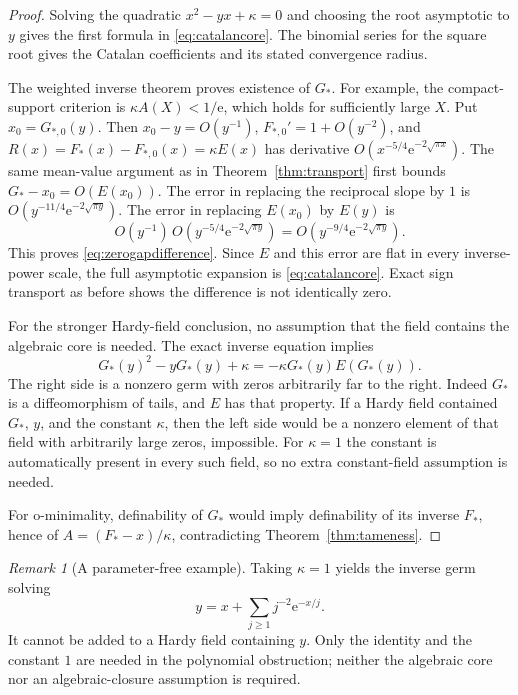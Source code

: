 \documentclass[11pt,a4paper]{article}
\theoremstyle{definition}
\theoremstyle{remark}
\newtheorem{remark}[theorem]{Remark}
\newcommand{\e}{\mathrm e}
\numberwithin{equation}{section}
\begin{document}
\begin{proof}
Solving the quadratic $x^2-yx+\kappa=0$ and choosing the root asymptotic to $y$ gives the first formula in \eqref{eq:catalancore}. The binomial series for the square root gives the Catalan coefficients and its stated convergence radius.

The weighted inverse theorem proves existence of $G_*$. For example, the compact-support criterion is $\kappa A(X)<1/\e$, which holds for sufficiently large $X$. Put $x_0=G_{*,0}(y)$. Then $x_0-y=O(y^{-1})$, $F_{*,0}'=1+O(y^{-2})$, and $R(x)=F_*(x)-F_{*,0}(x)=\kappa E(x)$ has derivative $O(x^{-5/4}\e^{-2\sqrt{\pi x}})$. The same mean-value argument as in Theorem~\ref{thm:transport} first bounds $G_*-x_0=O(E(x_0))$. The error in replacing the reciprocal slope by $1$ is $O(y^{-11/4}\e^{-2\sqrt{\pi y}})$. The error in replacing $E(x_0)$ by $E(y)$ is
\[
 O(y^{-1})\,O(y^{-5/4}\e^{-2\sqrt{\pi y}})
 =O(y^{-9/4}\e^{-2\sqrt{\pi y}}).
\]
This proves \eqref{eq:zerogapdifference}. Since $E$ and this error are flat in every inverse-power scale, the full asymptotic expansion is \eqref{eq:catalancore}. Exact sign transport as before shows the difference is not identically zero.

For the stronger Hardy-field conclusion, no assumption that the field contains the algebraic core is needed. The exact inverse equation implies
\begin{equation}\label{eq:polynomialobstruction}
 G_*(y)^2-yG_*(y)+\kappa
 =-\kappa G_*(y)E(G_*(y)).
\end{equation}
The right side is a nonzero germ with zeros arbitrarily far to the right. Indeed $G_*$ is a diffeomorphism of tails, and $E$ has that property. If a Hardy field contained $G_*$, $y$, and the constant $\kappa$, then the left side would be a nonzero element of that field with arbitrarily large zeros, impossible. For $\kappa=1$ the constant is automatically present in every such field, so no extra constant-field assumption is needed.

For o-minimality, definability of $G_*$ would imply definability of its inverse $F_*$, hence of $A=(F_*-x)/\kappa$, contradicting Theorem~\ref{thm:tameness}.
\end{proof}

\begin{remark}[A parameter-free example]
Taking $\kappa=1$ yields the inverse germ solving
\[
 y=x+\sum_{j\ge1}j^{-2}\e^{-x/j}.
\]
It cannot be added to a Hardy field containing $y$. Only the identity and the constant $1$ are needed in the polynomial obstruction; neither the algebraic core nor an algebraic-closure assumption is required.
\end{remark}
\end{document}
